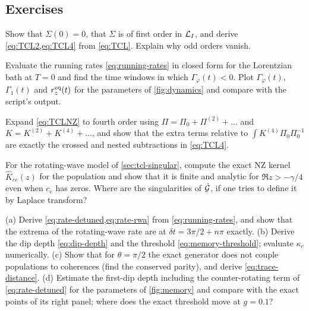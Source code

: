 \subsection{Exercises}

\begin{exercise}\label{ex:6-1}
Show that $\Sigma(0)=0$, that $\Sigma$ is of first order in $\mathcal{L}_I$, and derive \cref{eq:TCL2,eq:TCL4} from \cref{eq:TCL}.
Explain why odd orders vanish.
\end{exercise}

\begin{exercise}\label{ex:6-2}
Evaluate the running rates \eqref{eq:running-rates} in closed form for the Lorentzian bath at $T=0$ and find the time windows in which $\Gamma_\varphi(t)<0$.
Plot $\Gamma_\varphi(t)$, $\Gamma_1(t)$ and $r_z^{\rm eq}(t)$ for the parameters of \cref{fig:dynamics} and compare with the script's output.
\end{exercise}

\begin{exercise}\label{ex:6-3}
Expand \cref{eq:TCLNZ} to fourth order using $\Pi=\Pi_0+\Pi^{(2)}+\dots$ and $K=K^{(2)}+K^{(4)}+\dots$, and show that the extra terms relative to $\int K^{(4)}\Pi_0\Pi_0^{-1}$ are exactly the crossed and nested subtractions in \cref{eq:TCL4}.
\end{exercise}

\begin{exercise}\label{ex:6-4}
For the rotating-wave model of \cref{sec:tcl-singular}, compute the exact NZ kernel $\hat K_{ee}(z)$ for the population and show that it is finite and analytic for $\Re z>-\gamma/4$ even when $c_e$ has zeros.
Where are the singularities of $\hat{\mathcal{G}}$, if one tries to define it by Laplace transform?
\end{exercise}

\begin{exercise}\label{ex:6-5}
(a) Derive \cref{eq:rate-detuned,eq:rate-rwa} from \cref{eq:running-rates}, and show that the extrema of the rotating-wave rate are at $\delta t=3\pi/2+n\pi$ exactly.
(b) Derive the dip depth \eqref{eq:dip-depth} and the threshold \eqref{eq:memory-threshold}; evaluate $\kappa_c$ numerically.
(c) Show that for $\theta=\pi/2$ the exact generator does not couple populations to coherences (find the conserved parity), and derive \cref{eq:trace-distance}.
(d) Estimate the first-dip depth including the counter-rotating term of \cref{eq:rate-detuned} for the parameters of \cref{fig:memory} and compare with the exact points of its right panel; where does the exact threshold move at $g=0.1$?
\end{exercise}

\clearpage
